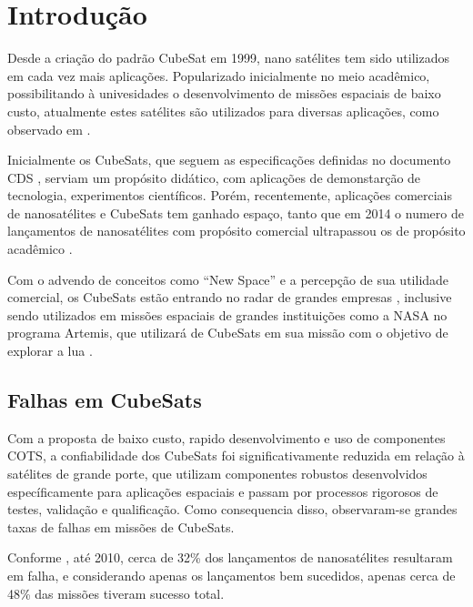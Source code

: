 \chapter{Introdução}\label{cap:intro}

Desde a criação do padrão CubeSat em 1999, nano satélites tem sido utilizados em cada vez mais aplicações. Popularizado inicialmente no meio acadêmico, possibilitando à univesidades o desenvolvimento de missões espaciais de baixo custo, atualmente estes satélites são utilizados para diversas aplicações, como observado em \textcite{modern-small-sats-economics}.

Inicialmente os CubeSats, que seguem as especificações definidas no documento \gls{CDS} \cite{cds}, serviam um propósito didático, com aplicações de demonstarção de tecnologia, experimentos científicos.
Porém, recentemente, aplicações comerciais de nanosatélites e CubeSats tem ganhado espaço, tanto que em 2014 o numero de lançamentos de nanosatélites com propósito comercial ultrapassou os de propósito acadêmico \cite{modern-small-sats-economics}.

Com o advendo de conceitos como “New Space” e a percepção de sua utilidade comercial, os CubeSats estão entrando no radar de grandes empresas \cite{modern-small-sats-economics}, inclusive sendo utilizados em missões espaciais de grandes instituições como a NASA no programa Artemis, que utilizará de CubeSats em sua missão com o objetivo de explorar a lua \cite{artemis-plan}.

\section{Falhas em CubeSats}\label{sec:intro-falhas}

Com a proposta de baixo custo, rapido desenvolvimento e uso de componentes \gls{COTS}, a confiabilidade dos CubeSats foi significativamente reduzida em relação à satélites de grande porte, que utilizam componentes robustos desenvolvidos específicamente para aplicações espaciais e passam por processos rigorosos de testes, validação e qualificação.
Como consequencia disso, observaram-se grandes taxas de falhas em missões de CubeSats.

Conforme \textcite{survey-nanosat-missions-2010}, até 2010, cerca de 32\% dos lançamentos de nanosatélites resultaram em falha, e considerando apenas os lançamentos bem sucedidos, apenas cerca de 48\% das missões tiveram sucesso total.

